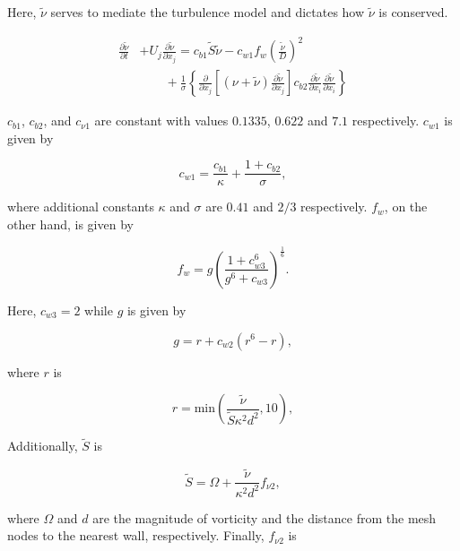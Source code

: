 \documentclass[a4paper,fleqn]{cas-sc}
\begin{document}
\noindent Here, $\tilde{\nu}$ serves to mediate the turbulence model and dictates how $\tilde{\nu}$ is conserved.

\begin{align}
  \label{eq:kineticEddyTransport}
  \frac{\partial \tilde{\nu}}{\partial t} &+ U_{j} \frac{\partial \tilde{\nu}}{\partial x_{j}} = c_{b1}\tilde{S}\tilde{\nu} - c_{w1} f_{w} \left( \frac{\tilde{\nu}}{D} \right)^{2} \nonumber \\
  &\qquad {} + \frac{1}{\sigma} \left\{ \frac{\partial}{\partial x_{j}} \left[ \left( \nu + \tilde{\nu} \right) \frac{\partial \tilde{\nu}}{\partial x_{j}} \right] c_{b2} \frac{\partial \tilde{\nu}}{\partial x_{i}} \frac{\partial \tilde{\nu}}{\partial x_{i}} \right\}
\end{align}

$c_{b1}$, $c_{b2}$, and $c_{\nu 1}$ are constant with values $0.1335$, $0.622$ and $7.1$ respectively. $c_{w1}$ is given by

\begin{equation}
  c_{w1} = \frac{c_{b1}}{\kappa} + \frac{1+c_{b2}}{\sigma},
  \label{eq:cw1}
\end{equation}

\noindent where additional constants $\kappa$ and $\sigma$ are $0.41$ and $2/3$ respectively. $f_{w}$, on the other hand, is given by

\begin{equation}
  f_{w} = g \left( \frac{1 + c^{6}_{w3}}{g^{6} + c_{w3}} \right)^{\frac{1}{6}}.
  \label{eq:fw}
\end{equation}

\noindent Here, $c_{w3} = 2$ while $g$ is given by

\begin{equation}
  g = r + c_{w2} \left( r^{6} - r \right),
  \label{eq:g}
\end{equation}

\noindent where $r$ is

\begin{equation}
  r = \text{min} \left( \frac{\tilde{\nu}}{\tilde{S} \kappa^{2} d^{2}}, 10 \right),
  \label{eq:r}
\end{equation}

Additionally, $\tilde{S}$ is

\begin{equation}
  \tilde{S} = \Omega + \frac{\tilde{\nu}}{\kappa^{2} d^{2}} f_{\nu 2},
  \label{eq:sTilde}
\end{equation}

\noindent where $\Omega$ and $d$ are the magnitude of vorticity and the distance from the mesh nodes to the nearest wall, respectively. Finally, $f_{\nu 2}$ is
\end{document}
